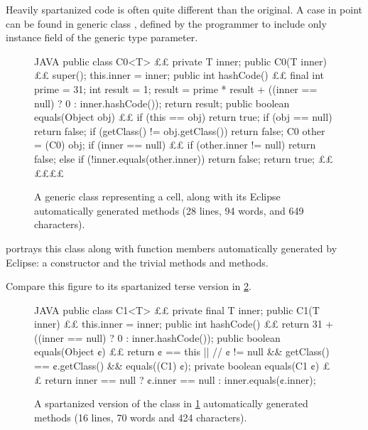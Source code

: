 Heavily spartanized code is often quite different than the original. A case in
point can be found in generic class , defined by the programmer to
include only instance field  of the generic type parameter.

\begin{figure}
  \caption{\label{figure:cell0}%
    A generic class representing a cell, along with its Eclipse
  automatically generated methods (28 lines, 94 words, and 649 characters).}
    \begin{adjustbox}{max width=\columnwidth}
\begin{code}[minipage, width=1.25\columnwidth]{JAVA}
public class C0<T> {££
  private T inner;
  public C0(T inner) {££
    super();
    this.inner = inner;
  }
  public int hashCode() {££
    final int prime = 31;
    int result = 1;
    result = prime * result + ((inner == null) ? 0 : inner.hashCode());
    return result;
  }
  public boolean equals(Object obj) {££
    if (this == obj)
      return true;
    if (obj == null)
      return false;
    if (getClass() != obj.getClass())
      return false;
    C0 other = (C0) obj;
    if (inner == null) {££
      if (other.inner != null)
        return false;
    } else if (!inner.equals(other.inner))
      return false;
    return true;
  }££
}££££
\end{code}
\end{adjustbox}
\end{figure}

 portrays this class along with function members
automatically generated by Eclipse: a constructor and the trivial methods
 and  methods.

Compare this figure to its spartanized terse version in \cref{figure:cell1}.

\begin{figure}
  \caption{\label{figure:cell1}%
    A spartanized version of the \Java class in \cref{figure:cell0}
    automatically generated methods (16 lines, 70 words and 424 characters).}
    \begin{adjustbox}{max width=\columnwidth}
\begin{code}[minipage, width=1.25\columnwidth]{JAVA}
public class C1<T> {££
  private final T inner;
  public C1(T inner) {££
    this.inner = inner;
  }
  public int hashCode() {££
    return 31 + ((inner == null) ? 0 : inner.hashCode());
  }
  public boolean equals(Object ¢) {££
    return ¢ == this || //
      ¢ != null && getClass() == ¢.getClass() && equals((C1) ¢);
  }
  private boolean equals(C1 ¢) {££
    return inner == null ? ¢.inner == null : inner.equals(¢.inner);
  }
}
\end{code}
\end{adjustbox}
\end{figure}


